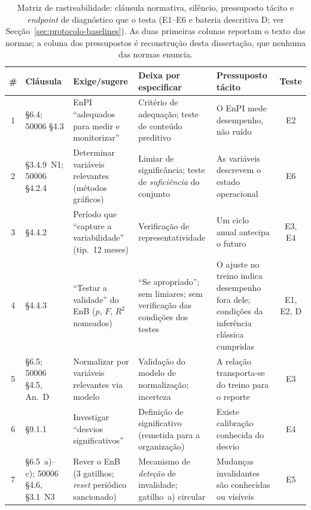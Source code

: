 \begin{table}[htbp]
  \centering\footnotesize
  \caption[Matriz de rastreabilidade cláusula--silêncio--pressuposto--teste]{Matriz de rastreabilidade: cláusula normativa, silêncio, pressuposto tácito
  e \emph{endpoint} de diagnóstico que o testa (E1--E6 e bateria descritiva D;
  ver Secção~\ref{sec:protocolo-baselines}). As duas primeiras colunas
  reportam o texto das normas; a coluna dos pressupostos é reconstrução desta
  dissertação, que nenhuma das normas enuncia.}
  \label{tab:matriz-rastreabilidade}
  \begin{tabularx}{\textwidth}{@{}c >{\raggedright\arraybackslash}p{2.1cm} X X X c@{}}
    \toprule
    \# & \textbf{Cláusula} & \textbf{Exige/sugere} & \textbf{Deixa por especificar} & \textbf{Pressuposto tácito} & \textbf{Teste} \\
    \midrule
    1 & 50001 \S6.4; 50006 \S4.3 & EnPI \enquote{adequados para medir e monitorizar} & Critério de adequação; teste de conteúdo preditivo & O EnPI mede desempenho, não ruído & E2 \\
    2 & 50001 \S3.4.9~N1; 50006 \S4.2.4 & Determinar variáveis relevantes (métodos gráficos) & Limiar de significância; teste de \emph{suficiência} do conjunto & As variáveis descrevem o estado operacional & E6 \\
    3 & 50006 \S4.4.2 & Período que \enquote{capture a variabilidade} (tip.\ 12 meses) & Verificação de representatividade & Um ciclo anual antecipa o futuro & E3, E4 \\
    4 & 50006 \S4.4.3 & \enquote{Testar a validade} do EnB ($p$, $F$, $R^2$ nomeados) & \enquote{Se apropriado}; sem limiares; sem verificação das condições dos testes & O ajuste no treino indica desempenho fora dele; condições da inferência clássica cumpridas & E1, E2, D \\
    5 & 50001 \S6.5; 50006 \S4.5, An.~D & Normalizar por variáveis relevantes via modelo & Validação do modelo de normalização; incerteza & A relação transporta-se do treino para o reporte & E3 \\
    6 & 50001 \S9.1.1 & Investigar \enquote{desvios significativos} & Definição de significativo (remetida para a organização) & Existe calibração conhecida do desvio & E4 \\
    7 & 50001 \S6.5~a)--c); 50006 \S4.6, \S3.1~N3 & Rever o EnB (3 gatilhos; \emph{reset} periódico sancionado) & Mecanismo de \emph{deteção} de invalidade; gatilho~a) circular & Mudanças invalidantes são conhecidas ou visíveis & E5 \\

\end{tabularx}
\end{table}
